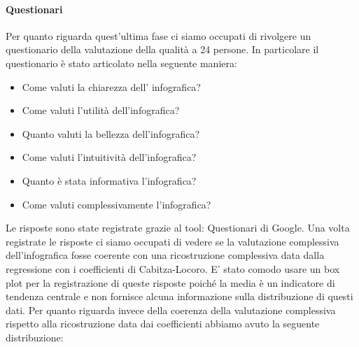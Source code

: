 \documentclass[10pt, a4paper,openany]{article}
\begin{document}
\paragraph{Questionari} Per quanto riguarda quest'ultima fase ci siamo occupati di rivolgere un questionario della valutazione della qualità a 24 persone. In particolare il questionario è stato articolato nella seguente maniera:
\begin{itemize}
	\item Come valuti la chiarezza dell' infografica?
	\item Come valuti l'utilità dell'infografica?
	\item Quanto valuti la bellezza dell'infografica?
	\item Come valuti l'intuitività dell'infografica?
	\item Quanto è stata informativa l'infografica?
	\item Come valuti complessivamente l'infografica?
\end{itemize}
Le risposte sono state registrate grazie al tool: Questionari di Google. Una volta registrate le risposte ci siamo occupati di vedere se la valutazione complessiva dell'infografica fosse coerente con una ricostruzione complessiva data dalla regressione con i coefficienti di Cabitza-Locoro.
E' stato comodo usare un box plot per la registrazione di queste risposte poiché la media è un indicatore di tendenza centrale e non fornisce alcuna informazione sulla distribuzione di questi dati.
Per quanto riguarda invece della coerenza della valutazione complessiva rispetto alla ricostruzione data dai coefficienti abbiamo avuto la seguente distribuzione:
\end{document}
